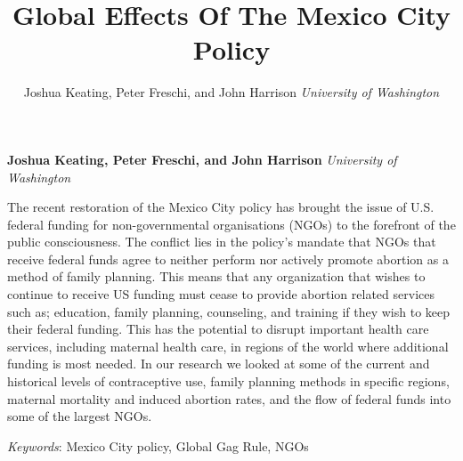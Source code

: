 \documentclass[11pt,]{article}
\title{Global Effects Of The Mexico City Policy  }
\author{\Large Joshua Keating, Peter Freschi, and John Harrison\vspace{0.05in} \newline\normalsize\emph{University of Washington}  }
\date{}
\newcommand*{\authorfont}{\fontfamily{phv}\selectfont}
\renewenvironment{abstract}
 {{%
    \setlength{\leftmargin}{0mm}
    \setlength{\rightmargin}{\leftmargin}%
  }%
  \relax}
 {\endlist}
\begin{document}
	
%

{%
\setlength{\parindent}{0pt}
\thispagestyle{plain}
{\fontsize{18}{20}\selectfont\raggedright 
\maketitle  %

}

{
   \vskip 13.5pt\relax \normalsize\fontsize{11}{12} 
\textbf{\authorfont Joshua Keating, Peter Freschi, and John Harrison} \hskip 15pt \emph{\small University of Washington}   

}

}







\begin{abstract}

    \hbox{\vrule height .2pt width 39.14pc}

    \vskip 8.5pt %

\noindent The recent restoration of the Mexico City policy has brought the issue
of U.S. federal funding for non-governmental organisations (NGOs) to the
forefront of the public consciousness. The conflict lies in the policy's
mandate that NGOs that receive federal funds agree to neither perform
nor actively promote abortion as a method of family planning. This means
that any organization that wishes to continue to receive US funding must
cease to provide abortion related services such as; education, family
planning, counseling, and training if they wish to keep their federal
funding. This has the potential to disrupt important health care
services, including maternal health care, in regions of the world where
additional funding is most needed. In our research we looked at some of
the current and historical levels of contraceptive use, family planning
methods in specific regions, maternal mortality and induced abortion
rates, and the flow of federal funds into some of the largest NGOs.


\vskip 8.5pt \noindent \emph{Keywords}: Mexico City policy, Global Gag Rule, NGOs \par

    \hbox{\vrule height .2pt width 39.14pc}



\end{abstract}
\end{document}
